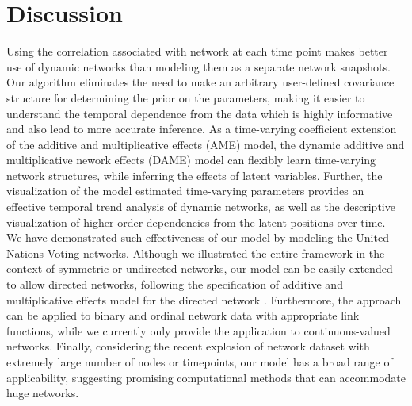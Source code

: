 \documentclass[a4paper]{article}
\begin{document}
\section{Discussion}
Using the correlation associated with network at each time point makes better use of dynamic networks than modeling them as a separate network snapshots. Our algorithm eliminates the need to make an arbitrary user-defined covariance structure for determining the prior on the parameters, making it easier to understand the temporal dependence from the data which is  highly informative and also lead to more accurate inference.  As a time-varying coefficient extension of the additive and multiplicative effects (AME) model, the dynamic additive and multiplicative nework effects (DAME) model can flexibly learn time-varying network structures, while inferring the effects of latent variables. Further, the visualization of the model estimated time-varying parameters provides an effective temporal trend analysis of dynamic networks, as well as the descriptive visualization of higher-order dependencies from the latent positions over time.
\\\newline
We have demonstrated such effectiveness of our model by modeling the United Nations Voting networks. Although we illustrated the entire framework in the context of symmetric or undirected networks, our model can be easily extended to allow directed networks, following the specification of additive and multiplicative effects model for the directed network \citep{minhas2016inferential}. Furthermore, the approach can be applied to binary and ordinal network data with appropriate link functions, while we currently only provide the application to continuous-valued networks.  Finally, considering the recent explosion of network dataset with extremely large number of nodes or timepoints, our model has a broad range of applicability, suggesting promising computational methods that can accommodate huge networks.


\newpage
\end{document}

